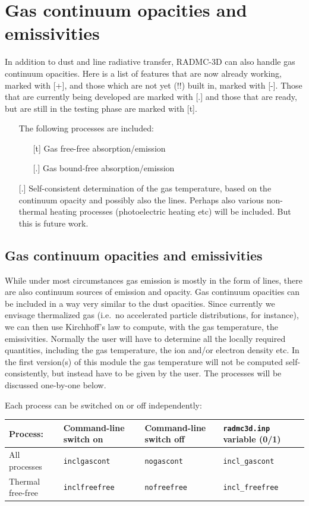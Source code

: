 \documentclass{report}
\begin{document}
\chapter{Gas continuum opacities and emissivities}
\label{chap-gas-continuum}
%
In addition to dust and line radiative transfer, RADMC-3D can also handle
gas continuum opacities. Here is a list of features that are now already
working, marked with [+], and those which are not yet (!!) built in,
marked with [-]. Those that are currently being developed are marked with
[.] and those that are ready, but are still in the testing phase are marked
with [t].
\begin{itemize}
\item[] The following processes are included:
  \begin{itemize}
  \item[][t] Gas free-free absorption/emission
  \item[][.] Gas bound-free absorption/emission
  \end{itemize}
\item[][.] Self-consistent determination of the gas temperature, based
  on the continuum opacity and possibly also the lines. Perhaps also 
  various non-thermal heating processes (photoelectric heating etc) will
  be included. But this is future work.
\end{itemize}


\section{Gas continuum opacities and emissivities}
While under most circumstances gas emission is mostly in the form of 
lines, there are also continuum sources of emission and opacity. 
Gas continuum opacities can be included in a way very similar to the dust
opacities.  Since currently we envisage thermalized gas (i.e.\ no
accelerated particle distributions, for instance), we can then use
Kirchhoff's law to compute, with the gas temperature, the
emissivities. Normally the user will have to determine all the locally
required quantities, including the gas temperature, the ion and/or electron
density etc. In the first version(s) of this module the gas temperature will
not be computed self-consistently, but instead have to be given by the user.
The processes will be discussed one-by-one below. 

Each process can be switched on or off independently:\\
\begin{tabular}{llll}
Process:  &  Command-line switch on & Command-line switch off & {\small\tt radmc3d.inp} variable (0/1) \\
\hline
All processes     & {\small\tt inclgascont} & {\small\tt nogascont} & {\small\tt incl\_gascont} \\
Thermal free-free & {\small\tt inclfreefree} & {\small\tt nofreefree} & {\small\tt incl\_freefree} \\
\end{tabular}
\end{document}
